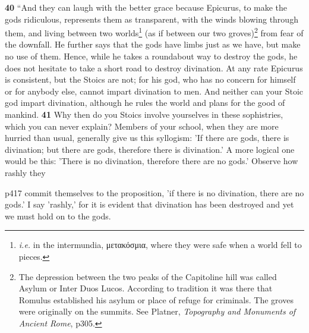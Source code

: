\textbf{40} ``And they can laugh with the better grace because Epicurus, to make the gods ridiculous, represents them as transparent, with the winds blowing through them, and living between two worlds\texthebrew{}\footnote{\emph{i.e.} in the intermundia, \textgreek{μετακόσμια}, where they were safe when a world fell to pieces.

} (as if between our two groves)\texthebrew{}\footnote{The depression between the two peaks of the Capitoline hill was called Asylum or Inter Duos Lucos. According to tradition it was there that Romulus established his asylum or place of refuge for criminals. The groves were originally on the summits. See Platner, \emph{Topography and Monuments of Ancient Rome}, p305.

} from fear of the downfall. He further says that the gods have limbs just as we have, but make no use of them. Hence, while he takes a roundabout way to destroy the gods, he does not hesitate to take a short road to destroy divination. At any rate Epicurus is consistent, but the Stoics are not; for his god, who has no concern for himself or for anybody else, cannot impart divination to men. And neither can your Stoic god impart divination, although he rules the world and plans for the good of mankind. \textbf{41} Why then do you Stoics involve yourselves in these sophistries, which you can never explain? Members of your school, when they are more hurried than usual, generally give us this syllogism: 'If there are gods, there is divination; but there are gods, therefore there is divination.' A more logical one would be this: 'There is no divination, therefore there are no gods.' Observe how rashly they

p417 commit themselves to the proposition, 'if there is no divination, there are no gods.' I say 'rashly,' for it is evident that divination has been destroyed and yet we must hold on to the gods.

